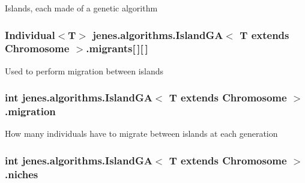 Islands, each made of a genetic algorithm \hypertarget{classjenes_1_1algorithms_1_1_island_g_a_3_01_t_01extends_01_chromosome_01_4_a735171ab63805fccccdc5f87941fdfe2}{
\subsubsection[{migrants}]{\setlength{\rightskip}{0pt plus 5cm}Individual$<$T$>$ jenes.\-algorithms.\-Island\-G\-A$<$ T extends Chromosome $>$.migrants\mbox{[}$\,$\mbox{]}\mbox{[}$\,$\mbox{]}\hspace{0.3cm}{\ttfamily [private]}}}\label{classjenes_1_1algorithms_1_1_island_g_a_3_01_t_01extends_01_chromosome_01_4_a735171ab63805fccccdc5f87941fdfe2}
Used to perform migration between islands \hypertarget{classjenes_1_1algorithms_1_1_island_g_a_3_01_t_01extends_01_chromosome_01_4_a9bba629926d756819b7725f170b76fd4}{
\subsubsection[{migration}]{\setlength{\rightskip}{0pt plus 5cm}int jenes.\-algorithms.\-Island\-G\-A$<$ T extends Chromosome $>$.migration\hspace{0.3cm}{\ttfamily [private]}}}\label{classjenes_1_1algorithms_1_1_island_g_a_3_01_t_01extends_01_chromosome_01_4_a9bba629926d756819b7725f170b76fd4}
How many individuals have to migrate between islands at each generation \hypertarget{classjenes_1_1algorithms_1_1_island_g_a_3_01_t_01extends_01_chromosome_01_4_a02fc5f134e4e02b3a29afc3bce1ab46f}{
\subsubsection[{niches}]{\setlength{\rightskip}{0pt plus 5cm}int jenes.\-algorithms.\-Island\-G\-A$<$ T extends Chromosome $>$.niches\hspace{0.3cm}{\ttfamily [private]}}}\label{classjenes_1_1algorithms_1_1_island_g_a_3_01_t_01extends_01_chromosome_01_4_a02fc5f134e4e02b3a29afc3bce1ab46f}
